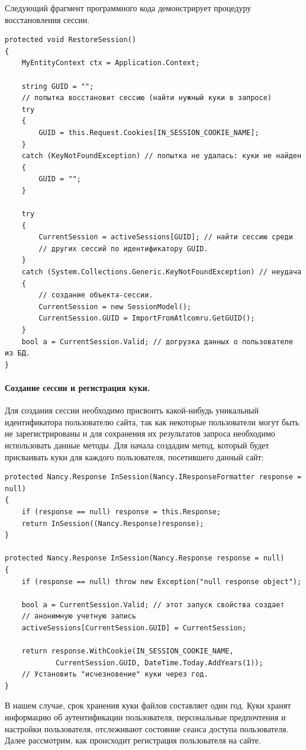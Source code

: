 \documentclass[a4paper,14pt,openany,final]{extreport} %
\begin{document}
{Следующий фрагмент программного кода демонстрирует процедуру восстановления сессии.
\begin{verbatim}
protected void RestoreSession()
{
    MyEntityContext ctx = Application.Context;

    string GUID = "";
    // попытка восстановит сессию (найти нужный куки в запросе)
    try
    {
        GUID = this.Request.Cookies[IN_SESSION_COOKIE_NAME];
    }
    catch (KeyNotFoundException) // попытка не удалась: куки не найден
    {
        GUID = "";
    }

    try
    {
        CurrentSession = activeSessions[GUID]; // найти сессию среди
        // других сессий по идентификатору GUID.
    }
    catch (System.Collections.Generic.KeyNotFoundException) // неудача
    {
        // создание объекта-сессии.
        CurrentSession = new SessionModel();
        CurrentSession.GUID = ImportFromAtlcomru.GetGUID();
    }
    bool a = CurrentSession.Valid; // догрузка данных о пользователе из БД.
}
\end{verbatim}

\paragraph{Создание сессии и регистрация куки.}
Для создания сессии необходимо присвоить какой-нибудь уникальный идентификатора пользователю сайта, так как некоторые пользователи могут быть не зарегистрированы и для сохранения их результатов запроса необходимо использовать данные методы.
Для начала создадим метод, который будет присваивать куки для каждого пользователя, посетившего данный сайт:
\begin{verbatim}
protected Nancy.Response InSession(Nancy.IResponseFormatter response = null)
{
    if (response == null) response = this.Response;
    return InSession((Nancy.Response)response);
}

protected Nancy.Response InSession(Nancy.Response response = null)
{
    if (response == null) throw new Exception("null response object");

    bool a = CurrentSession.Valid; // этот запуск свойства создает
    // анонимную учетную запись
    activeSessions[CurrentSession.GUID] = CurrentSession;

    return response.WithCookie(IN_SESSION_COOKIE_NAME,
            CurrentSession.GUID, DateTime.Today.AddYears(1));
    // Установить "исчезновение" куки через год.
}
\end{verbatim}
В нашем случае, срок хранения куки файлов составляет один год. Куки хранят информацию об аутентификации пользователя, персональные предпочтения и настройки пользователя, отслеживают состояние сеанса доступа пользователя. Далее рассмотрим, как происходит регистрация пользователя на сайте.

}
\end{document}
